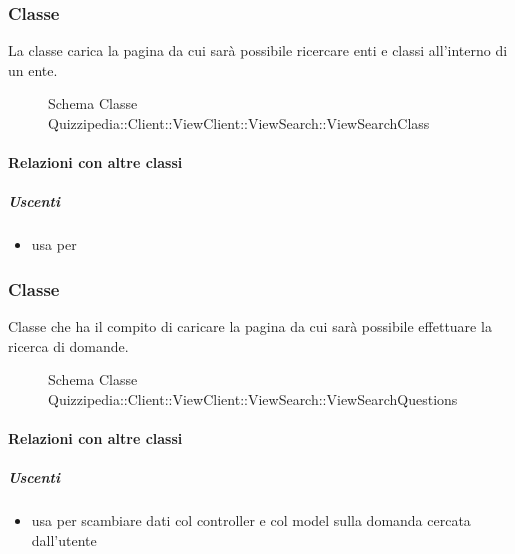 \subsubsection{Classe }
La classe carica la pagina da cui sarà possibile ricercare enti e classi all'interno di un ente.
\begin{figure}[H]
\centering
\noindent{}
\caption[Schema Classe ViewSearchClass]{Schema Classe Quizzipedia::Client::ViewClient::ViewSearch::ViewSearchClass}
\end{figure}
\paragraph{Relazioni con altre classi}
\subparagraph{Uscenti}
\begin{itemize}
\item usa  per 
\end{itemize}
\subsubsection{Classe }
Classe che ha il compito di caricare la pagina da cui sarà possibile effettuare la ricerca di domande.
\begin{figure}[H]
\centering
\noindent{}
\caption[Schema Classe ViewSearchQuestions]{Schema Classe Quizzipedia::Client::ViewClient::ViewSearch::ViewSearchQuestions}
\end{figure}
\paragraph{Relazioni con altre classi}
\subparagraph{Uscenti}
\begin{itemize}
\item usa  per scambiare dati col controller e col model sulla domanda cercata dall'utente
\end{itemize}
